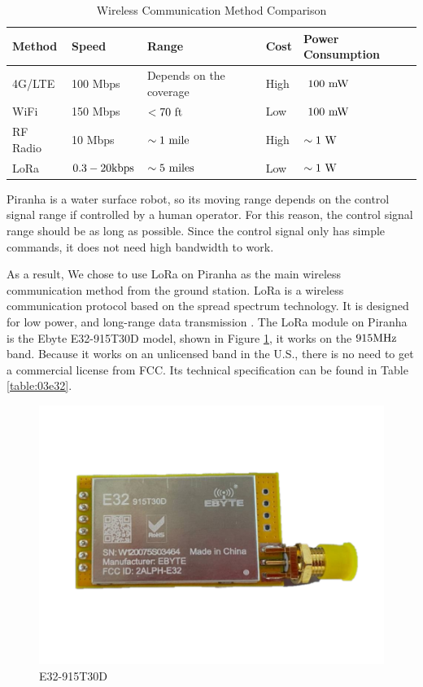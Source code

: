 \begin{table}[H]
\caption{Wireless Communication Method Comparison} %
\centering %
\renewcommand{\arraystretch}{0.8}
\begin{tabular}{l l l l l} %
\hline
\textbf{Method} & \textbf{Speed} & \textbf{Range} & \textbf{Cost} & \textbf{Power Consumption} \\ 

\hline %
4G/LTE & 100 Mbps & Depends on the coverage & High\footnotemark & $~100\ {\rm mW}$ \\
WiFi & 150 Mbps & $< 70\ {\rm ft}$ & Low & $~100\ {\rm mW}$ \\
RF Radio & 10 Mbps & $\sim 1\ {\rm mile}$ & High & $\sim 1\ {\rm W}$ \\
LoRa & $0.3- 20 {\rm kbps}$ & $\sim 5\ {\rm miles}$ & Low & $\sim 1\ {\rm W}$ \\
\hline
\end{tabular}
\label{table:03wireless} %
\end{table}


Piranha is a water surface robot, so its moving range depends on the control signal range if controlled by a human operator. For this reason, the control signal range should be as long as possible. Since the control signal only has simple commands, it does not need high bandwidth to work.

As a result, We chose to use LoRa on Piranha as the main wireless communication method from the ground station. LoRa is a wireless communication protocol based on the spread spectrum technology. It is designed for low power, and long-range data transmission \cite{8075570}. The LoRa module on Piranha is the Ebyte E32-915T30D model, shown in Figure \ref{fig:03e32}, it works on the $915 {\rm MHz}$ band. Because it works on an unlicensed band in the U.S., there is no need to get a commercial license from FCC. Its technical specification can be found in Table \ref{table:03e32}.

\begin{figure}
    \centering
    \includegraphics[width=.6\textwidth]{images/03e32.png}
    \caption{E32-915T30D}
    \label{fig:03e32}
\end{figure}

